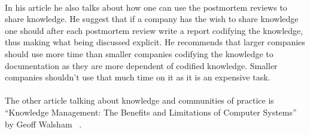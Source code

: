 \documentclass{article}
\begin{document}
\paragraph{}In his article he also talks about how one can use the postmortem reviews to share knowledge. He suggest that if a company has the wish to share knowledge one should after each postmortem review write a report codifying the knowledge, thus making what being discussed explicit. He recommends that larger companies should use more time than smaller companies codifying the knowledge to documentation as they are more dependent of codified knowledge. Smaller companies shouldn't use that much time on it as it is an expensive task.

\paragraph{}The other article talking about knowledge and communities of practice is ``Knowledge Management: The Benefits and Limitations of Computer Systems'' by Geoff Walsham ~\cite{Walsham}. 

\paragraph{}



\end{document}
